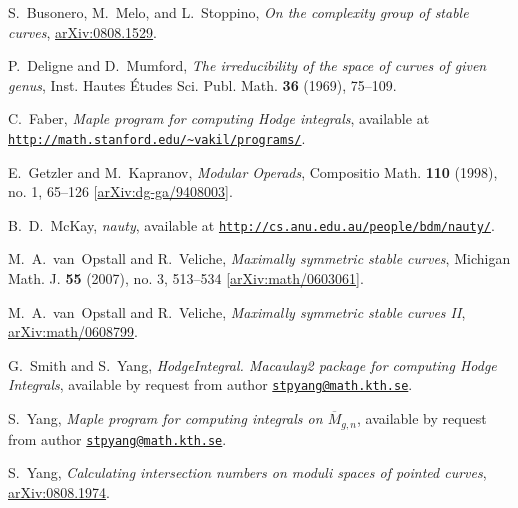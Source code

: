\documentclass{amsart}
\newcommand{\arXiv}[1]{\href{http://arxiv.org/abs/#1}{arXiv:#1}}
\theoremstyle{plain}
\theoremstyle{definition}
\begin{document}


\begin{thebibliography}{2}

  S.~Busonero, M.~Melo, and L.~Stoppino,
  \emph{On the complexity group of stable curves},
  \arXiv{0808.1529}.%

  P.~Deligne and D.~Mumford,
  \emph{The irreducibility of the space of curves of given genus},
  Inst. Hautes \'Etudes Sci. Publ. Math. \textbf{36} (1969), 75--109.

  C.~Faber,
  \emph{Maple program for computing Hodge integrals},
  available at \href{http://math.stanford.edu/~vakil/programs/}
  {\texttt{http://math.stanford.edu/\~{}vakil/programs/}}.

  E.~Getzler and M.~Kapranov,
  \emph{Modular Operads},
  Compositio Math. \textbf{110} (1998), no. 1, 65--126
  [\arXiv{dg-ga/9408003}].

  B.~D.~McKay,
  \emph{nauty},
  available at \href{http://cs.anu.edu.au/people/bdm/nauty/}
  {\texttt{http://cs.anu.edu.au/people/bdm/nauty/}}.

  M.~A.~van~Opstall and R.~Veliche,
  \emph{Maximally symmetric stable curves},
  Michigan Math. J. \textbf{55} (2007), no. 3, 513--534
  [\arXiv{math/0603061}].

  M.~A.~van~Opstall and R.~Veliche,
  \emph{Maximally symmetric stable curves II},
  \arXiv{math/0608799}.%

  G.~Smith and S.~Yang,
  \emph{HodgeIntegral. Macaulay2 package for computing Hodge Integrals},
  available by request from author \href{mailto:stpyang@math.kth.se}
  {\texttt{stpyang@math.kth.se}}.

  S.~Yang,
  \emph{Maple program for computing integrals on $\overline{M}_{g,n}$},
  available by request from author \href{mailto:stpyang@math.kth.se}
  {\texttt{stpyang@math.kth.se}}.

  S.~Yang,
  \emph{Calculating intersection numbers on moduli spaces of pointed curves},
  \arXiv{0808.1974}.%

\end{thebibliography}
\end{document}
